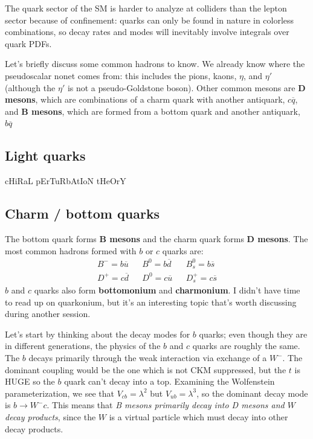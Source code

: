\documentclass[11pt, oneside]{article}   	%
\theoremstyle{definition}
\numberwithin{equation}{subsection}		%
\begin{document}
The quark sector of the SM is harder to analyze at colliders than the lepton sector because of confinement: quarks can only be found in 
nature in colorless combinations, so decay rates and modes will inevitably involve integrals over quark PDFs. 

Let's briefly discuss some common hadrons to know. We already know where the pseudoscalar nonet comes from: this includes the pions, 
kaons, $\eta$, and $\eta'$ (although the $\eta'$ is not a pseudo-Goldstone boson). Other common mesons are \textbf{D mesons}, which are 
combinations of a charm quark with another antiquark, $c\overline q$, and \textbf{B mesons}, which are formed from a bottom quark and 
another antiquark, $b\overline q$

\subsection{Light quarks}

cHiRaL pErTuRbAtIoN tHeOrY


\subsection{Charm / bottom quarks}

The bottom quark forms \textbf{B mesons} and the charm quark forms \textbf{D mesons}. The most common hadrons formed with $b$ 
or $c$ quarks are:
\begin{align}
	B^- = b\overline u && B^0 = b\overline d && B_s^0 = b\overline s \\
	D^+ = c\overline d && D^0 = c\overline u && D_s^+ = c\overline s
\end{align}
$b$ and $c$ quarks also form \textbf{bottomonium} and \textbf{charmonium}. I didn't have time to read up on quarkonium, but it's an 
interesting topic that's worth discussing during another session.

Let's start by thinking about the decay modes for $b$ quarks; even though they are in different generations, the physics of the $b$ and $c$ 
quarks are roughly the same. The $b$ decays primarily through the weak interaction via exchange of a $W^-$. The dominant coupling would 
be the one which is not CKM suppressed, but the $t$ is HUGE so the $b$ quark can't decay into a top. Examining the Wolfenstein 
parameterization, we see that $V_{cb} = \lambda^2$ but $V_{ub} = \lambda^3$, so the dominant decay mode is $b\rightarrow W^- c$. 
This means that \textit{B mesons primarily decay into D mesons and $W$ decay products}, since the $W$ is a virtual particle which 
must decay into other decay products.
\end{document}
